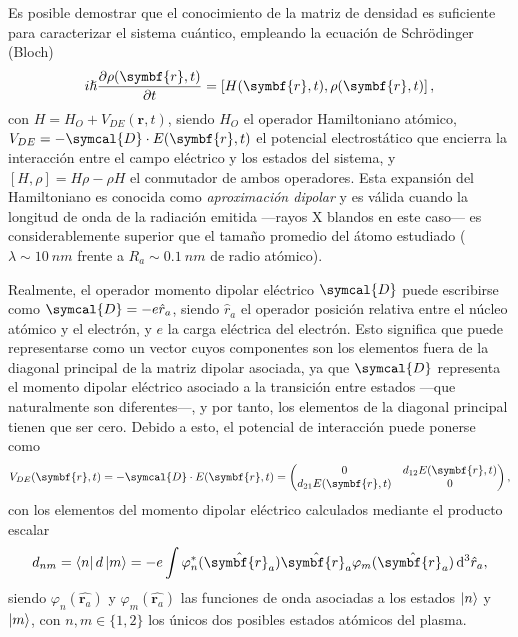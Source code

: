 Es posible demostrar \autocite{Cohen-Tannoudji2019} que el conocimiento de la matriz de densidad es suficiente para caracterizar el sistema cuántico, empleando la ecuación de Schrödinger (Bloch)
\begin{equation}\label{eq:3.12}
  i \hslash \pdv{\rho(\symbf{r},t)}{t} = \left[H(\symbf{r},t),\rho(\symbf{r},t)\right],
\end{equation}
con $H = H_{O} + V_{DE}(\symbf{r},t)$, siendo $H_{O}$ el operador Hamiltoniano atómico, $V_{DE} = -\symcal{D} \cdot E(\symbf{r},t)$ el potencial electrostático que encierra la interacción entre el campo eléctrico y los estados del sistema, y $\left[H, \rho\right] = H \rho - \rho H$ el conmutador de ambos operadores. Esta expansión del Hamiltoniano es conocida como \emph{aproximación dipolar} \autocite{Jackson1998} y es válida cuando la longitud de onda de la radiación emitida ---rayos X blandos en este caso--- es considerablemente superior que el tamaño promedio del átomo estudiado ($\lambda \sim \qty{10}{nm}$ frente a $R_{a} \sim \qty{0.1}{nm}$ de radio atómico). 

Realmente, el operador momento dipolar eléctrico $\symcal{D}$ puede escribirse como $\symcal{D} = -e \hat{r}_{a}$, siendo $\hat{r}_{a}$ el operador posición relativa entre el núcleo atómico y el electrón, y $e$ la carga eléctrica del electrón. Esto significa que puede representarse como un vector cuyos componentes son los elementos fuera de la diagonal principal de la matriz dipolar asociada, ya que $\symcal{D}$ representa el momento dipolar eléctrico asociado a la transición entre estados ---que naturalmente son diferentes---, y por tanto, los elementos de la diagonal principal tienen que ser cero. Debido a esto, el potencial de interacción puede ponerse como
\begin{equation}
  V_{DE}(\symbf{r},t) = -\symcal{D} \cdot E(\symbf{r},t) =  
  \begin{pmatrix}
    0 & d_{12}E(\symbf{r},t) \\
    d_{21}E(\symbf{r},t) & 0 \\
  \end{pmatrix},
\end{equation}
con los elementos del momento dipolar eléctrico calculados mediante el producto escalar 
\begin{equation}\label{eq:3.13}
  d_{nm} = \bra{n}d \ket{m} = -e \int \varphi^{*}_{n}(\hat{\symbf{r}_{a}}) \hat{\symbf{r}_{a}} \varphi_{m}(\hat{\symbf{r}_{a}}) \diff^{3}\hat{r}_{a},
\end{equation}
siendo $\varphi_{n}(\hat{\symbf{r}_{a}})$ y $\varphi_{m}(\hat{\symbf{r}_{a}})$ las funciones de onda asociadas a los estados $\left|n\right\rangle$ y $\left|m\right\rangle$, con $n, m \in \{1,2\}$ los únicos dos posibles estados atómicos del plasma.

